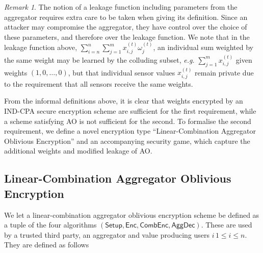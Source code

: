 \documentclass[10pt,journal,compsoc]{IEEEtran}
\theoremstyle{definition}
\theoremstyle{definition}
\theoremstyle{remark}
\newtheorem*{remark}{Remark}
\begin{document}
\begin{remark} \label{rem:lcao_leakage}
    The notion of a leakage function including parameters from the aggregator requires extra care to be taken when giving its definition. Since an attacker may compromise the aggregator, they have control over the choice of these parameters, and therefore over the leakage function. We note that in the leakage function above, $\sum^n_{i=n}\sum^m_{j=1}x^{(t)}_{i,j}\omega^{(t)}_j$, an individual sum weighted by the same weight may be learned by the colluding subset, \textit{e.g.} $\sum^m_{j=1}x^{(t)}_{i,j}$ given weights $(1,0,\dots,0)$, but that individual sensor values $x^{(t)}_{i,j}$ remain private due to the requirement that all sensors receive the same weights.
\end{remark}

From the informal definitions above, it is clear that weights encrypted by an IND-CPA secure encryption scheme are sufficient for the first requirement, while a scheme satisfying AO is not sufficient for the second. To formalise the second requirement, we define a novel encryption type ``Linear-Combination Aggregator Oblivious Encryption'' and an accompanying security game, which capture the additional weights and modified leakage of AO.

% 
% 

\subsection{Linear-Combination Aggregator Oblivious Encryption} \label{subsec:lcao}
We let a linear-combination aggregator oblivious encryption scheme be defined as a tuple of the four algorithms $(\mathsf{Setup}, \mathsf{Enc}, \mathsf{CombEnc}, \mathsf{AggDec})$. These are used by a trusted third party, an aggregator and value producing users $i\,1\leq i \leq n$. They are defined as follows
\end{document}
